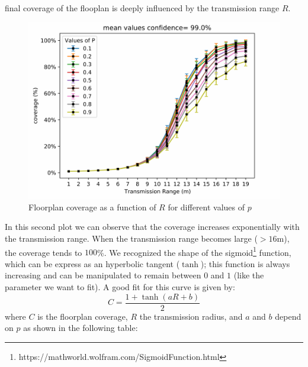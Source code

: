 final coverage of the flooplan is deeply influenced by the transmission range $R$.
\begin{figure}[H]
    \begin{center}
        \includegraphics[scale=.75]{img/Big_CovRange_mean.pdf}
    \end{center}
    \vspace*{-0.5cm}
    \caption{Floorplan coverage as a function of $R$ for different values of $p$}
    \label{fig:floorplancoverage2}
\end{figure}
\noindent
In this second plot we can observe that the coverage increases exponentially
with the transmission range. When the transmission range becomes large
($> 16$m), the coverage tends to $100$\%. We recognized the shape of the
sigmoid\footnote{https://mathworld.wolfram.com/SigmoidFunction.html} function,
which can be express as an hyperbolic tangent ($\tanh$); this function is always
increasing and can be manipulated to remain between $0$ and $1$ (like the
parameter we want to fit). A good fit for this curve is given by:
\begin{equation*}
    C = \frac{1+\tanh(aR+b)}{2}
\end{equation*}
where $C$ is the floorplan coverage, $R$ the transmission radius, and $a$ and
$b$ depend on $p$ as shown in the following table:
